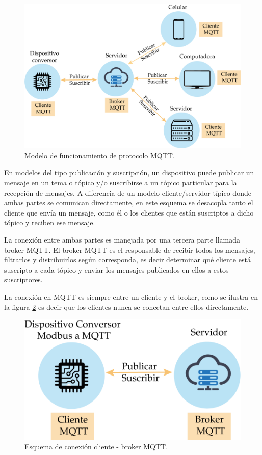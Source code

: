 \begin{figure}[htpb]
	\centering
	\includegraphics[scale=.7]{./Figures/mqtt-protocol.png}
	\caption[Esquema de funcionamiento MQTT ]{Modelo de funcionamiento de protocolo MQTT.}
	\label{fig:mqtt-esquema}
\end{figure}

En modelos del tipo publicación y suscripción, un dispositivo puede publicar un mensaje en un tema o tópico y/o suscribirse a un tópico particular para la recepción de mensajes.  A diferencia de un modelo cliente/servidor típico donde ambas partes se comunican directamente, en este esquema se desacopla tanto el cliente que envía un mensaje, como él o los clientes que están suscriptos a dicho tópico y reciben ese mensaje. 

La conexión entre ambas partes es manejada por una tercera parte llamada broker MQTT.  El broker MQTT es el responsable de recibir todos los mensajes, filtrarlos y distribuirlos según corresponda, es decir determinar qué cliente está suscripto a cada tópico y enviar los mensajes publicados en ellos a estos suscriptores.

La conexión en MQTT es siempre entre un cliente y el broker, como se ilustra en la figura \ref{fig:mqtt-cliente-broker} es decir que los clientes nunca se conectan entre ellos directamente.

\begin{figure}[htpb]
	\centering
	\includegraphics[scale=.7]{./Figures/cliente-broker.png}
	\caption{Esquema de conexión cliente - broker MQTT.}
	\label{fig:mqtt-cliente-broker}
\end{figure}


